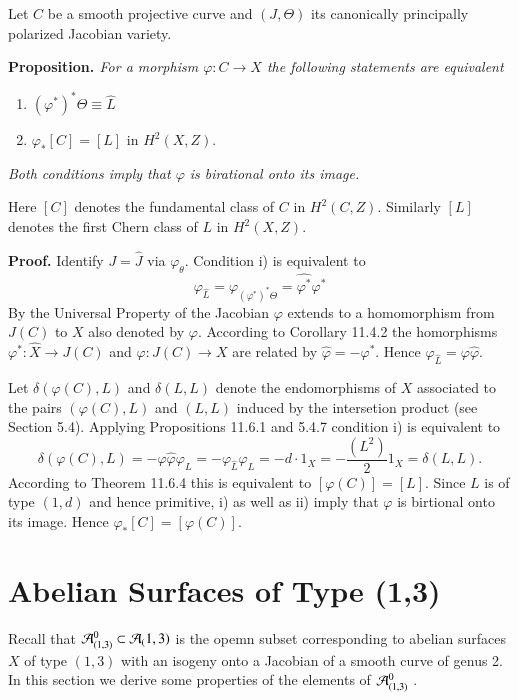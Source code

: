 Let $C$ be a smooth projective curve and $(J, \Theta)$ its canonically principally polarized Jacobian variety.

\medskip
\noindent
{\bfseries {} Proposition. \label{art11-prop-4.3}} \textit{For a morphism $\varphi : C \rightarrow X$ the following statements are equivalent}
\begin{enumerate}[{\it i)}]
\item $(\varphi^{*})^{*} \Theta \equiv \widehat{L}$

\item $\varphi_{*}[C] = [L]$ in $H^{2}(X, Z)$.
\end{enumerate}
\textit{Both conditions imply that $ \varphi$ is birational onto its image.}

Here $[C]$ denotes the fundamental class of $C$ in $H^{2}(C, Z)$. Similarly $[L]$ denotes the first Chern class of $L$ in $H^{2}(X, Z)$. 

{\bfseries Proof.} Identify $J=\hat{J}$ via $\varphi_{\theta}$. Condition i) is equivalent to
$$
\varphi_{\hat{L}} = \varphi_{(\varphi^{*})^{*}\Theta} = \widehat{\varphi^{*}}\varphi^{*}
$$
By the Universal Property of the Jacobian $\varphi$ extends to a homomorphism from $J(C)$ to $X$ also denoted
by $\varphi$. According to \cite{art11-keyL-B} Corollary 11.4.2 the homorphisms $\varphi^{*}: \widehat{X} \rightarrow J(C)$ and $\varphi : J(C) \rightarrow X$ are related by $\widehat{\varphi} =-\varphi^{*}$.
Hence $\varphi_{\widehat{L}} =\varphi\widehat{\varphi}$.

Let $\delta(\varphi(C), L)$ and $\delta(L, L)$ denote the endomorphisms of $X$ associated to the pairs $(\varphi(C), L)$ and $(L, L)$ induced by the intersetion product (see \cite{art11-keyL-B} Section 5.4). Applying \cite{art11-keyL-B} Propositions 11.6.1 and 5.4.7 condition i) is equivalent to
$$
\delta(\varphi(C), L) = -\varphi\widehat{\varphi}\varphi_{L} = -\varphi_{\widehat{L}}\varphi_{L} = -d \cdot 1_{X} = -\dfrac{(L^{2})}{2}1_{X} = \delta(L,L).
$$
According to \cite{art11-keyL-B} Theorem 11.6.4 this is equivalent to $[\varphi(C)]= [L]$. Since $L$ is of type $(1,d)$ and
hence primitive, i) as well as ii) imply that $\varphi$ is birtional onto its image. Hence $\varphi_{*}[C]=[\varphi(C)]$.  

\section{Abelian Surfaces of Type (1,3)}\label{art11-sec-5}
Recall that $\mathcal{A}_{(1,3)}^{0} \subset \mathcal{A}_(1,3)$ is the opemn subset corresponding to abelian surfaces $X$ of type $(1,3)$ with an isogeny onto a Jacobian of a smooth curve of genus 2. In this section we derive some properties of the elements of $\mathcal{A}_{(1,3)}^{0}$ .


